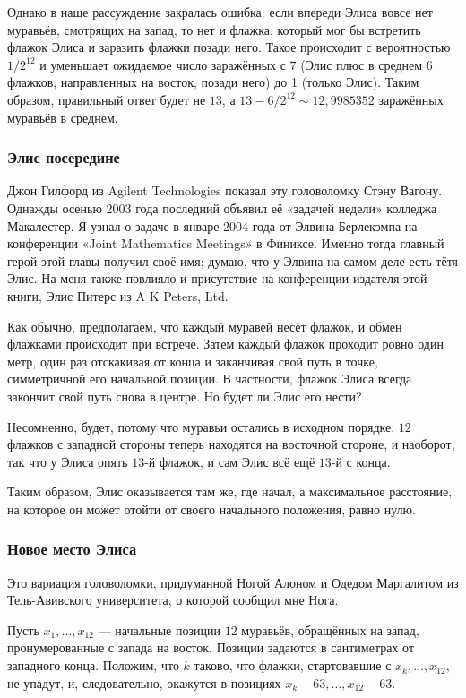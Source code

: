 Однако в наше рассуждение закралась ошибка: если впереди Элиса вовсе нет муравьёв, смотрящих на запад, то нет и флажка, который мог бы встретить флажок Элиса и заразить флажки позади него.
Такое происходит с вероятностью $1/2^{12}$ и уменьшает ожидаемое число заражённых с $7$ (Элис плюс в среднем 6 флажков, направленных на восток, позади него) до 1 (только Элис).
Таким образом, правильный ответ будет не $13$, а $13 - 6/2^{12} \sim 12{,}9985352$ заражённых муравьёв в среднем.

\subsubsection*{Элис посередине}

Джон Гилфорд из Agilent Technologies показал эту головоломку Стэну Вагону.
Однажды осенью 2003 года последний объявил её «задачей недели» колледжа Макалестер.
Я узнал о задаче в январе 2004 года от Элвина Берлекэмпа на конференции «Joint Mathematics Meetings» в Финиксе.
Именно тогда главный герой этой главы получил своё имя;
думаю, что у Элвина на самом деле есть тётя Элис.
На меня также повлияло и присутствие на конференции издателя этой книги, Элис Питерс из A K Peters, Ltd.

Как обычно, предполагаем, что каждый муравей несёт флажок, и обмен флажками происходит при встрече.
Затем каждый флажок проходит ровно один метр, один раз отскакивая от конца и заканчивая свой путь в точке, симметричной его начальной позиции.
В частности, флажок Элиса всегда закончит свой путь снова в центре. Но будет ли Элис его нести?

Несомненно, будет, потому что муравьи остались в исходном порядке.
$12$ флажков с западной стороны теперь находятся на восточной стороне, и наоборот, так что у Элиса опять $13$-й флажок, и сам Элис всё ещё $13$-й с конца.

Таким образом, Элис оказывается там же, где начал, а максимальное расстояние, на которое он может отойти от своего начального положения, равно нулю.

\subsubsection*{Новое место Элиса}

Это вариация головоломки, придуманной Ногой Алоном и Одедом Маргалитом из Тель-Авивского университета, о которой сообщил мне Нога.

Пусть $x_1,\dots,x_{12}$ --- начальные позиции $12$ муравьёв, обращённых на запад, пронумерованные с запада на восток.
Позиции задаются в сантиметрах от западного конца.
Положим, что $k$ таково, что флажки, стартовавшие с $x_k,\dots,x_{12}$, не упадут, и, следовательно, окажутся в позициях $x_k-63,\dots,x_{12}-63$.

